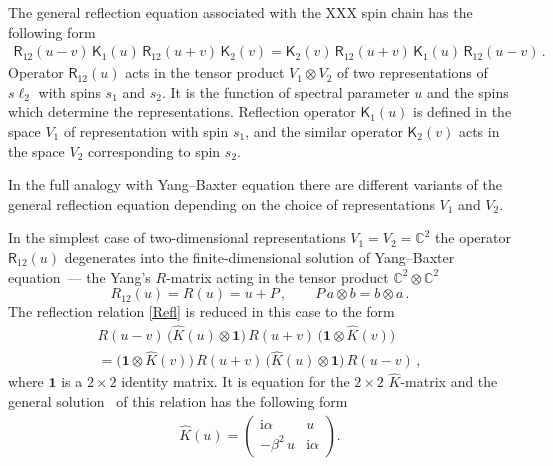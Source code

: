 \documentclass[11pt]{article}
\numberwithin{equation}{section}
\theoremstyle{plain}
\theoremstyle{definition}
\newcommand{\R}{\mathsf{R}}
\newcommand{\K}{\mathsf{K}}
\renewcommand{\imath}{\mathrm{i}}
\begin{document}
The general reflection equation associated with the XXX spin chain has the following form \cite{Skl}
\begin{align}\label{Refl}
	\R_{12}(u-v)\,\K_1(u)\,\R_{12}(u+v)\,\K_2(v) = 
	\K_2(v)\,\R_{12}(u+v)\,\K_1(u)\,\R_{12}(u-v) \,.
\end{align}
Operator $\R_{12}(u)$ acts in the tensor product $V_1\otimes V_2$ 
of two representations of $s\ell_2$ with spins $s_1$ and $s_2$.
It is the function of spectral parameter $u$ and the spins which determine the representations. 
Reflection operator $\K_1(u)$ is defined in the space $V_1$ of representation with spin $s_1$, and the similar operator $\K_2(v)$ acts in the space $V_2$ corresponding to spin $s_2$.

In the full analogy with Yang--Baxter equation there are different variants 
of the general reflection equation depending on the choice of 
representations $V_1$ and $V_2$.

In the simplest case of two-dimensional representations $V_1=V_2=\mathbb{C}^2$ the operator $\R_{12}(u)$ degenerates into the finite-dimensional solution of Yang--Baxter equation~--- the Yang's $R$-matrix acting 
in the tensor product $\mathbb{C}^2\otimes \mathbb{C}^2$ 
\begin{equation} \nonumber
	R_{12}(u) = R(u) = u  + P \,, \qquad P\,a \otimes b = b \otimes a \,.
\end{equation}
The reflection relation \eqref{Refl} is reduced in this case to the form
\begin{multline} \label{ReflFundam}
	R(u-v)\, \bigl(\widehat{K}(u)\otimes \bm{1}\bigr)\,R(u+v)\, 
	\bigl(\bm{1} \otimes \widehat{K}(v)\bigr) \\[4pt]
	= \bigl(\bm{1} \otimes \widehat{K}(v)\bigr)\,R(u+v)\,\bigl(\widehat{K}(u)\otimes \bm{1}\bigr)\, R(u-v) \,,
\end{multline}
where $\bm{1}$ is a $2\times 2$ identity matrix. 
It is equation for the $2\times 2$ $\widehat{K}$-matrix and 
the general solution~\cite{Skl,IS} of this relation has the following form 
\begin{align}\label{K0}
	\widehat{K}(u) =  \begin{pmatrix}
		\imath \alpha & u \\[6pt]
		- \beta^2\, u  & \imath \alpha
	\end{pmatrix}.
\end{align}
\end{document}
